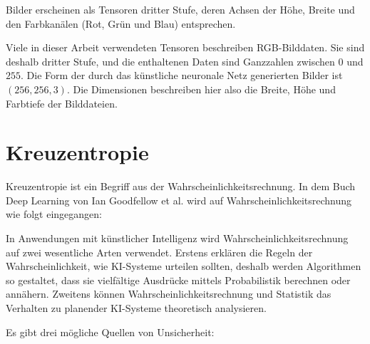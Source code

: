 Bilder erscheinen als Tensoren dritter Stufe, deren Achsen der Höhe, Breite und den Farbkanälen (Rot, Grün und Blau) entsprechen. \cite{zhang2020dive}

Viele in dieser Arbeit verwendeten Tensoren beschreiben RGB-Bilddaten. Sie sind deshalb dritter Stufe, und die enthaltenen Daten sind Ganzzahlen zwischen $0$ und $255$. Die Form der durch das künstliche neuronale Netz generierten Bilder ist $(256, 256, 3)$. Die Dimensionen beschreiben hier also die Breite, Höhe und Farbtiefe der Bilddateien.

\section{Kreuzentropie}
Kreuzentropie ist ein Begriff aus der Wahrscheinlichkeitsrechnung. In dem Buch Deep Learning von Ian Goodfellow et al. \cite{goodfellow2016deeplearning} wird auf Wahrscheinlichkeitsrechnung wie folgt eingegangen:

In Anwendungen mit künstlicher Intelligenz wird Wahrscheinlichkeitsrechnung auf zwei wesentliche Arten verwendet. Erstens erklären die Regeln der Wahrscheinlichkeit, wie KI-Systeme urteilen sollten, deshalb werden Algorithmen so gestaltet, dass sie vielfältige Ausdrücke mittels Probabilistik berechnen oder annähern. Zweitens können Wahrscheinlichkeitsrechnung und Statistik das Verhalten zu planender KI-Systeme theoretisch analysieren.

Es gibt drei mögliche Quellen von Unsicherheit:

